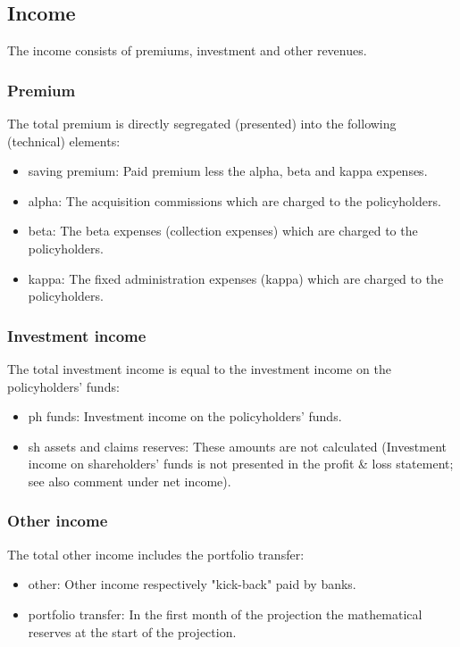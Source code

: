 \subsection{Income}

The income consists of premiums, investment and other revenues.

\subsubsection{Premium}
The total premium is directly segregated (presented) into the following (technical) elements:
\begin{itemize}
	\item saving premium: Paid premium less the alpha, beta and kappa expenses.
	\item alpha: The acquisition commissions which are charged to the policyholders.
	\item beta: The beta expenses (collection expenses) which are charged to the policyholders.
	\item kappa: The fixed administration expenses (kappa) which are charged to the policyholders.
\end{itemize}

\subsubsection{Investment income}
The total investment income is equal to the investment income on the policyholders' funds:
\begin{itemize}
	\item ph funds: Investment income on the policyholders' funds.
  \item sh assets and claims reserves: These amounts are not calculated (Investment income on shareholders' funds is not presented in the profit \& loss statement; see also comment under net income).
\end{itemize}

\subsubsection{Other income}
The total other income includes the portfolio transfer:
\begin{itemize}
	\item other: Other income respectively "kick-back" paid by banks.
	\item portfolio transfer: In the first month of the projection the mathematical reserves at the start of the projection.
\end{itemize}


